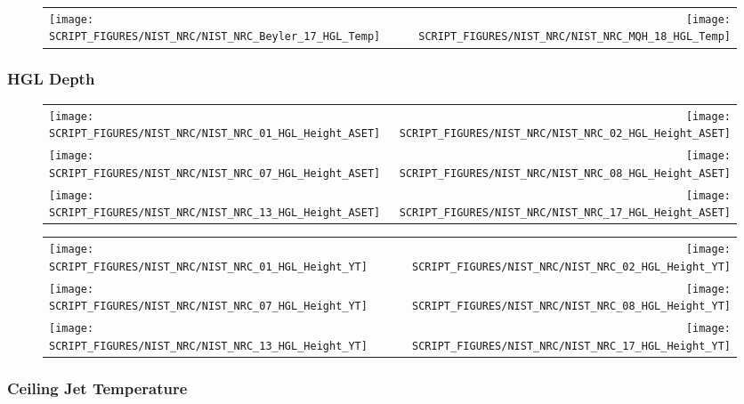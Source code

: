 \begin{figure}[p]
\begin{tabular*}{\textwidth}{l@{\extracolsep{\fill}}r}
\texttt{[image: SCRIPT\_FIGURES/NIST\_NRC/NIST\_NRC\_Beyler\_17\_HGL\_Temp]} &
\texttt{[image: SCRIPT\_FIGURES/NIST\_NRC/NIST\_NRC\_MQH\_18\_HGL\_Temp]}
\end{tabular*}
\end{figure}

\clearpage

\subsubsection{HGL Depth}

\begin{figure}[p]
\begin{tabular*}{\textwidth}{l@{\extracolsep{\fill}}r}
\texttt{[image: SCRIPT\_FIGURES/NIST\_NRC/NIST\_NRC\_01\_HGL\_Height\_ASET]} &
\texttt{[image: SCRIPT\_FIGURES/NIST\_NRC/NIST\_NRC\_02\_HGL\_Height\_ASET]} \\
\texttt{[image: SCRIPT\_FIGURES/NIST\_NRC/NIST\_NRC\_07\_HGL\_Height\_ASET]} &
\texttt{[image: SCRIPT\_FIGURES/NIST\_NRC/NIST\_NRC\_08\_HGL\_Height\_ASET]} \\
\texttt{[image: SCRIPT\_FIGURES/NIST\_NRC/NIST\_NRC\_13\_HGL\_Height\_ASET]} &
\texttt{[image: SCRIPT\_FIGURES/NIST\_NRC/NIST\_NRC\_17\_HGL\_Height\_ASET]}
\end{tabular*}
\end{figure}

\begin{figure}[p]
\begin{tabular*}{\textwidth}{l@{\extracolsep{\fill}}r}
\texttt{[image: SCRIPT\_FIGURES/NIST\_NRC/NIST\_NRC\_01\_HGL\_Height\_YT]} &
\texttt{[image: SCRIPT\_FIGURES/NIST\_NRC/NIST\_NRC\_02\_HGL\_Height\_YT]} \\
\texttt{[image: SCRIPT\_FIGURES/NIST\_NRC/NIST\_NRC\_07\_HGL\_Height\_YT]} &
\texttt{[image: SCRIPT\_FIGURES/NIST\_NRC/NIST\_NRC\_08\_HGL\_Height\_YT]} \\
\texttt{[image: SCRIPT\_FIGURES/NIST\_NRC/NIST\_NRC\_13\_HGL\_Height\_YT]} &
\texttt{[image: SCRIPT\_FIGURES/NIST\_NRC/NIST\_NRC\_17\_HGL\_Height\_YT]}
\end{tabular*}
\end{figure}

\clearpage

\subsubsection{Ceiling Jet Temperature}

